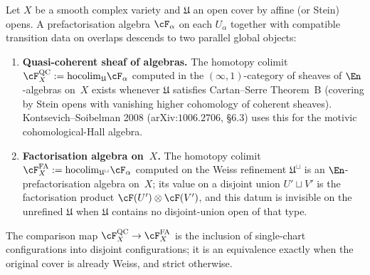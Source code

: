 \begin{theorem}
\label{thm:two-descent-targets}
Let $X$ be a smooth complex variety and $\mathfrak U$ an open cover by affine (or Stein) opens. A prefactorisation algebra $\cF_\alpha$ on each $U_\alpha$ together with compatible transition data on overlaps descends to two parallel global objects:
\begin{enumerate}[label=\textup{(\roman*)}]
 \item \textbf{Quasi-coherent sheaf of algebras.} The homotopy colimit $\cF_X^{\mathrm{QC}} := \mathrm{hocolim}_{\mathfrak U} \cF_\alpha$ computed in the $(\infty, 1)$-category of sheaves of $\En$-algebras on~$X$ exists whenever $\mathfrak U$ satisfies Cartan--Serre Theorem~B (covering by Stein opens with vanishing higher cohomology of coherent sheaves). Kontsevich--Soibelman 2008 (arXiv:$1006.2706$, §$6.3$) uses this for the motivic cohomological-Hall algebra.
 \item \textbf{Factorisation algebra on~$X$.} The homotopy colimit $\cF_X^{\mathrm{FA}} := \mathrm{hocolim}_{\mathfrak U^\sqcup} \cF_\alpha$ computed on the Weiss refinement $\mathfrak U^\sqcup$ is an $\En$-prefactorisation algebra on~$X$; its value on a disjoint union $U' \sqcup V'$ is the factorisation product $\cF(U') \otimes \cF(V')$, and this datum is invisible on the unrefined $\mathfrak U$ when $\mathfrak U$ contains no disjoint-union open of that type.
\end{enumerate}
The comparison map $\cF_X^{\mathrm{QC}} \to \cF_X^{\mathrm{FA}}$ is the inclusion of single-chart configurations into disjoint configurations; it is an equivalence exactly when the original cover is already Weiss, and strict otherwise.
\end{theorem}

